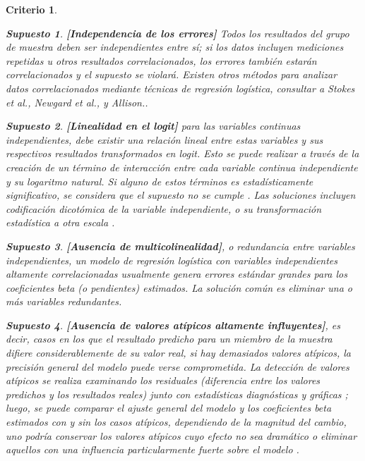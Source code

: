 \documentclass[12pt]{article}
\newtheorem{Criterio}{Criterio}%
\newtheorem{Sup}{Supuesto}%
\begin{document}
\begin{Criterio}
\begin{Sup}
\textbf{[Independencia de los errores]} Todos los resultados del grupo de muestra deben ser independientes entre s\'i; si los datos incluyen mediciones repetidas u otros resultados correlacionados, los errores tambi\'en estar\'an correlacionados y el supuesto se violar\'a.\cite{tabachnick2007} Existen otros m\'etodos para analizar datos correlacionados mediante t\'ecnicas de regresi\'on log\'istica, consultar a Stokes et al.,\cite{stokes2000} Newgard et al.,\cite{newgard2004, newgard2007} y Allison.\cite{allison1999}.
\end{Sup}

\begin{Sup} \textbf{[Linealidad en el logit]} para las variables continuas independientes, debe existir una relaci\'on lineal entre estas variables y sus respectivos resultados transformados en logit. Esto se puede realizar a trav\'es de la creaci\'on de un t\'ermino de interacci\'on entre cada variable continua independiente y su logaritmo natural. Si alguno de estos t\'erminos es estad\'isticamente significativo, se considera que el supuesto no se cumple \cite{tabachnick2007,hosmer2000}. Las soluciones incluyen codificaci\'on dicot\'omica de la variable independiente,\cite{hosmer2000} o su transformaci\'on estad\'istica a otra escala \cite{tabachnick2007,hosmer2000}.
\end{Sup}

\begin{Sup} \textbf{[Ausencia de multicolinealidad]}, o redundancia entre variables independientes,  un modelo de regresi\'on log\'istica con variables independientes altamente correlacionadas usualmente genera errores est\'andar grandes para los coeficientes beta (o pendientes) estimados. La soluci\'on com\'un es eliminar una o m\'as variables redundantes.\cite{tabachnick2007}
\end{Sup}

\begin{Sup} \textbf{[Ausencia de valores at\'ipicos altamente influyentes]}, es decir, casos en los que el resultado predicho para un miembro de la muestra difiere considerablemente de su valor real, si hay demasiados valores at\'ipicos, la precisi\'on general del modelo puede verse comprometida. La detecci\'on de valores at\'ipicos se realiza examinando los residuales (diferencia entre los valores predichos y los resultados reales) junto con estad\'isticas diagn\'osticas y gr\'aficas \cite{tabachnick2007,hosmer2000}; luego, se puede comparar el ajuste general del modelo y los coeficientes beta estimados con y sin los casos at\'ipicos, dependiendo de la magnitud del cambio, uno podr\'ia conservar los valores at\'ipicos cuyo efecto no sea dram\'atico\cite{hosmer2000} o eliminar aquellos con una influencia particularmente fuerte sobre el modelo \cite{tabachnick2007,hosmer2000}.
\end{Sup}
\end{Criterio}
\end{document}

